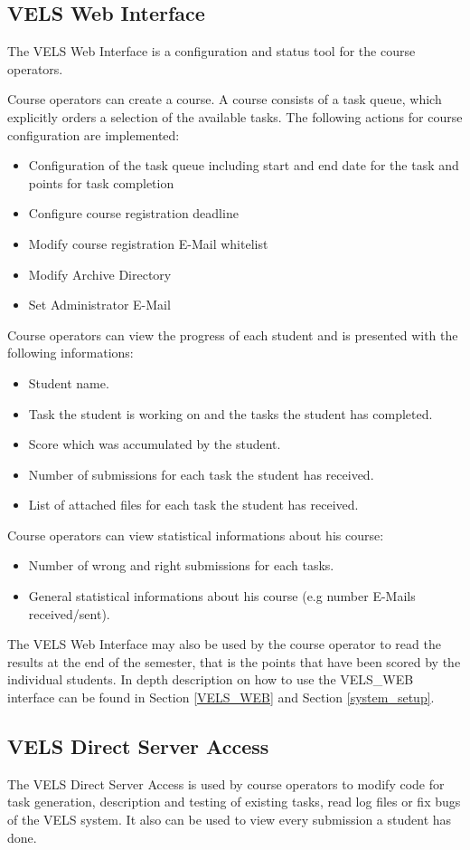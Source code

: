 \subsection{VELS Web Interface}\label{webinterface}

The VELS Web Interface is a configuration and status tool for the course operators.

Course operators can create a course. A course consists of a task queue, which explicitly orders a 
selection of the available tasks. The following actions for course configuration  are implemented:
\begin{itemize}
\item Configuration of the task queue including start and end date for the task and points for task completion
\item Configure course registration deadline
\item Modify course registration E-Mail whitelist 
\item Modify Archive Directory
\item Set Administrator E-Mail
\end{itemize}

Course operators can view the progress of each student and is presented with the following informations:
\begin{itemize}
\item Student name.
\item Task the student is working on and the tasks the student has completed.
\item Score which was accumulated by the student.
\item Number of submissions for each task the student has received.
\item List of attached files for each task the student has received.
\end{itemize}

Course operators can view statistical informations about his course:
\begin{itemize}
\item Number of wrong and right submissions for each tasks.
\item General statistical informations about his course (e.g number E-Mails received/sent).
\end{itemize}

The VELS Web Interface may also be used by the course operator to read the results at the end of the semester,
that is the points that have been scored by the individual students. In depth description on how to use the 
VELS\_WEB interface can be found in Section \ref{VELS_WEB} and Section \ref{system_setup}.


\subsection{VELS Direct Server Access}\label{directserveraccess}
The VELS Direct Server Access is used by course operators to  modify code for task
generation, description and testing of existing tasks, read log files or fix bugs of the VELS system. 
It also can be used to view every submission a student has done. 
